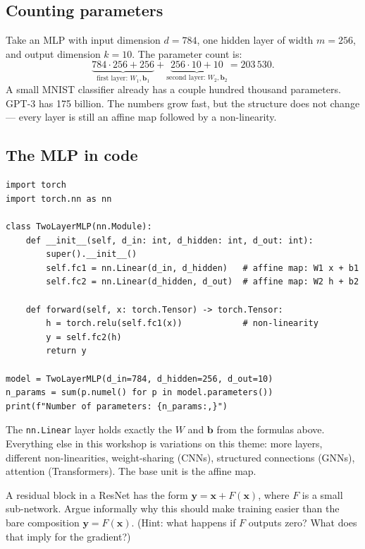 \subsection{Counting parameters}

Take an MLP with input dimension $d = 784$, one hidden layer of width $m = 256$, and output dimension $k = 10$. The parameter count is:
\[
\underbrace{784 \cdot 256 + 256}_{\text{first layer: } W_1, \bm{b}_1} + \underbrace{256 \cdot 10 + 10}_{\text{second layer: } W_2, \bm{b}_2} = 203\,530.
\]
A small MNIST classifier already has a couple hundred thousand parameters. GPT-3 has 175 billion. The numbers grow fast, but the structure does not change --- every layer is still an affine map followed by a non-linearity.

\subsection{The MLP in code}

\begin{verbatim}
import torch
import torch.nn as nn

class TwoLayerMLP(nn.Module):
    def __init__(self, d_in: int, d_hidden: int, d_out: int):
        super().__init__()
        self.fc1 = nn.Linear(d_in, d_hidden)   # affine map: W1 x + b1
        self.fc2 = nn.Linear(d_hidden, d_out)  # affine map: W2 h + b2

    def forward(self, x: torch.Tensor) -> torch.Tensor:
        h = torch.relu(self.fc1(x))            # non-linearity
        y = self.fc2(h)
        return y

model = TwoLayerMLP(d_in=784, d_hidden=256, d_out=10)
n_params = sum(p.numel() for p in model.parameters())
print(f"Number of parameters: {n_params:,}")
\end{verbatim}

The \texttt{nn.Linear} layer holds exactly the $W$ and $\bm{b}$ from the formulas above. Everything else in this workshop is variations on this theme: more layers, different non-linearities, weight-sharing (CNNs), structured connections (GNNs), attention (Transformers). The base unit is the affine map.

\begin{exercise}
A residual block in a ResNet has the form $\bm{y} = \bm{x} + F(\bm{x})$, where $F$ is a small sub-network. Argue informally why this should make training easier than the bare composition $\bm{y} = F(\bm{x})$. (Hint: what happens if $F$ outputs zero? What does that imply for the gradient?)
\end{exercise}

